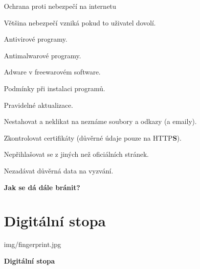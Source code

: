 \documentclass[aspectratio=1610]{beamer}
\begin{document}
\begin{frame}{Ochrana proti nebezpečí na internetu}
    \begin{cardTiny}
        \begin{flushleft}
            Většina nebezpečí vzniká pokud to uživatel dovolí.

            Antivirové programy.

            Antimalwarové programy.

            Adware v freewarovém software.

            Podmínky při instalaci programů.

            Pravidelné aktualizace.

            Nestahovat a neklikat na neznáme soubory a odkazy (a emaily).

            Zkontrolovat certifikáty (důvěrné údaje pouze na HTTP\textbf{S}).
            
            Nepřihlašovat se z jiných než oficiálních stránek.
            
            Nezadávat důvěrná data na vyzvání.
        \end{flushleft}
    \end{cardTiny}
    \begin{cardTiny}
        \begin{center}
            \textbf{Jak se dá dále bránit?}
        \end{center}
    \end{cardTiny}
\end{frame}


\section{Digitální stopa}

\begin{frameImg}[width]{img/fingerprint.jpg}
    \vspace*{60mm}
    \begin{cardTiny}
        \vspace*{\fill}
        \begin{center}
            \textbf{Digitální stopa}
        \end{center}
    \end{cardTiny}
\end{frameImg}
\end{document}
